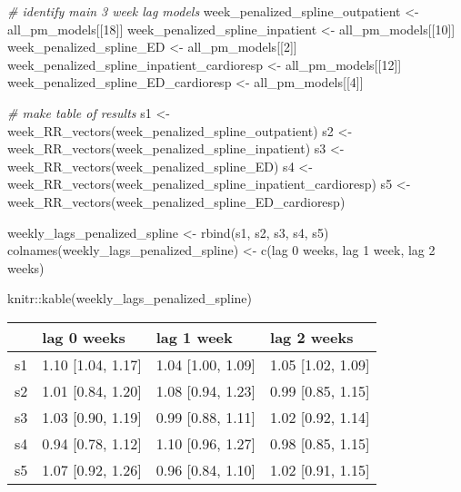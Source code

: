 \documentclass[
]{article}
\newenvironment{Shaded}{\begin{snugshade}}{\end{snugshade}}
\newcommand{\CommentTok}[1]{\textcolor[rgb]{0.56,0.35,0.01}{\textit{#1}}}
\newcommand{\DecValTok}[1]{\textcolor[rgb]{0.00,0.00,0.81}{#1}}
\newcommand{\FunctionTok}[1]{\textcolor[rgb]{0.00,0.00,0.00}{#1}}
\newcommand{\NormalTok}[1]{#1}
\newcommand{\OtherTok}[1]{\textcolor[rgb]{0.56,0.35,0.01}{#1}}
\newcommand{\SpecialCharTok}[1]{\textcolor[rgb]{0.00,0.00,0.00}{#1}}
\newcommand{\StringTok}[1]{\textcolor[rgb]{0.31,0.60,0.02}{#1}}
\begin{document}
\begin{Shaded}
\begin{Highlighting}[]
\CommentTok{\# identify main 3 week lag models}
\NormalTok{week\_penalized\_spline\_outpatient }\OtherTok{\textless{}{-}}\NormalTok{ all\_pm\_models[[}\DecValTok{18}\NormalTok{]]}
\NormalTok{week\_penalized\_spline\_inpatient }\OtherTok{\textless{}{-}}\NormalTok{ all\_pm\_models[[}\DecValTok{10}\NormalTok{]]}
\NormalTok{week\_penalized\_spline\_ED }\OtherTok{\textless{}{-}}\NormalTok{ all\_pm\_models[[}\DecValTok{2}\NormalTok{]]}
\NormalTok{week\_penalized\_spline\_inpatient\_cardioresp }\OtherTok{\textless{}{-}}\NormalTok{ all\_pm\_models[[}\DecValTok{12}\NormalTok{]]}
\NormalTok{week\_penalized\_spline\_ED\_cardioresp }\OtherTok{\textless{}{-}}\NormalTok{ all\_pm\_models[[}\DecValTok{4}\NormalTok{]]}

\CommentTok{\# make table of results}
\NormalTok{s1 }\OtherTok{\textless{}{-}} \FunctionTok{week\_RR\_vectors}\NormalTok{(week\_penalized\_spline\_outpatient)}
\NormalTok{s2 }\OtherTok{\textless{}{-}} \FunctionTok{week\_RR\_vectors}\NormalTok{(week\_penalized\_spline\_inpatient)}
\NormalTok{s3 }\OtherTok{\textless{}{-}} \FunctionTok{week\_RR\_vectors}\NormalTok{(week\_penalized\_spline\_ED)}
\NormalTok{s4 }\OtherTok{\textless{}{-}} \FunctionTok{week\_RR\_vectors}\NormalTok{(week\_penalized\_spline\_inpatient\_cardioresp)}
\NormalTok{s5 }\OtherTok{\textless{}{-}} \FunctionTok{week\_RR\_vectors}\NormalTok{(week\_penalized\_spline\_ED\_cardioresp)}

\NormalTok{weekly\_lags\_penalized\_spline }\OtherTok{\textless{}{-}} \FunctionTok{rbind}\NormalTok{(s1, s2, s3, s4, s5)}
\FunctionTok{colnames}\NormalTok{(weekly\_lags\_penalized\_spline) }\OtherTok{\textless{}{-}}
  \FunctionTok{c}\NormalTok{(}\StringTok{\textquotesingle{}lag 0 weeks\textquotesingle{}}\NormalTok{, }\StringTok{\textquotesingle{}lag 1 week\textquotesingle{}}\NormalTok{, }\StringTok{\textquotesingle{}lag 2 weeks\textquotesingle{}}\NormalTok{)}

\NormalTok{knitr}\SpecialCharTok{::}\FunctionTok{kable}\NormalTok{(weekly\_lags\_penalized\_spline)}
\end{Highlighting}
\end{Shaded}

\begin{longtable}[]{@{}llll@{}}
\toprule()
& lag 0 weeks & lag 1 week & lag 2 weeks \\
\midrule()
\endhead
s1 & 1.10 {[}1.04, 1.17{]} & 1.04 {[}1.00, 1.09{]} & 1.05 {[}1.02,
1.09{]} \\
s2 & 1.01 {[}0.84, 1.20{]} & 1.08 {[}0.94, 1.23{]} & 0.99 {[}0.85,
1.15{]} \\
s3 & 1.03 {[}0.90, 1.19{]} & 0.99 {[}0.88, 1.11{]} & 1.02 {[}0.92,
1.14{]} \\
s4 & 0.94 {[}0.78, 1.12{]} & 1.10 {[}0.96, 1.27{]} & 0.98 {[}0.85,
1.15{]} \\
s5 & 1.07 {[}0.92, 1.26{]} & 0.96 {[}0.84, 1.10{]} & 1.02 {[}0.91,
1.15{]} \\
\bottomrule()
\end{longtable}
\end{document}
